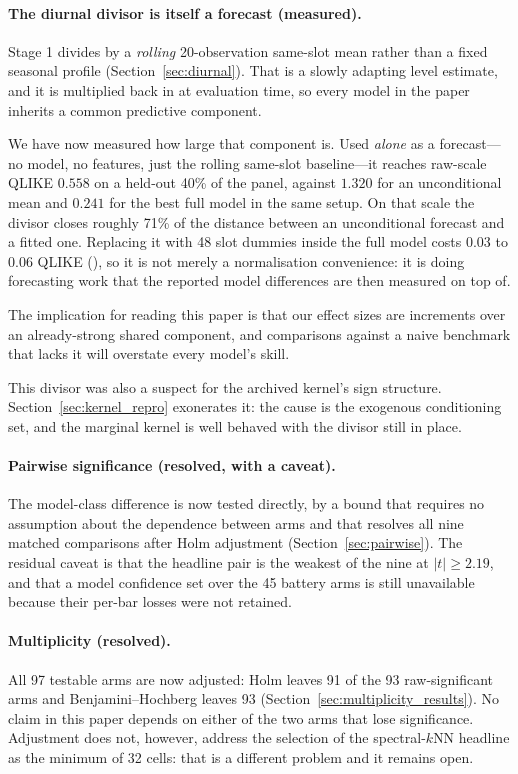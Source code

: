 \paragraph{The diurnal divisor is itself a forecast (measured).} Stage 1
divides by a \emph{rolling} 20-observation same-slot mean rather than a fixed
seasonal profile (Section~\ref{sec:diurnal}). That is a slowly adapting level
estimate, and it is multiplied back in at evaluation time, so every model in
the paper inherits a common predictive component.

We have now measured how large that component is. Used \emph{alone} as a
forecast---no model, no features, just the rolling same-slot baseline---it
reaches raw-scale QLIKE $0.558$ on a held-out 40\% of the panel, against
$1.320$ for an unconditional mean and $0.241$ for the best full model in the
same setup. On that scale the divisor closes roughly 71\% of the distance
between an unconditional forecast and a fitted one. Replacing it with 48 slot
dummies inside the full model costs $0.03$ to $0.06$ QLIKE
(), so it is not merely a normalisation
convenience: it is doing forecasting work that the reported model differences
are then measured on top of.

The implication for reading this paper is that our effect sizes are increments
over an already-strong shared component, and comparisons against a naive
benchmark that lacks it will overstate every model's skill.

This divisor was also a suspect for the archived kernel's sign structure.
Section~\ref{sec:kernel_repro} exonerates it: the cause is the exogenous
conditioning set, and the marginal kernel is well behaved with the divisor
still in place.

\paragraph{Pairwise significance (resolved, with a caveat).} The model-class
difference is now tested directly, by a bound that requires no assumption about
the dependence between arms and that resolves all nine matched comparisons
after Holm adjustment (Section~\ref{sec:pairwise}). The residual caveat is that
the headline pair is the weakest of the nine at $|t| \ge 2.19$, and that a
model confidence set over the 45 battery arms is still unavailable because
their per-bar losses were not retained.

\paragraph{Multiplicity (resolved).} All 97 testable arms are now adjusted:
Holm leaves 91 of the 93 raw-significant arms and Benjamini--Hochberg leaves 93
(Section~\ref{sec:multiplicity_results}). No claim in this paper depends on
either of the two arms that lose significance. Adjustment does not, however,
address the selection of the spectral-$k$NN headline as the minimum of 32
cells: that is a different problem and it remains open.

